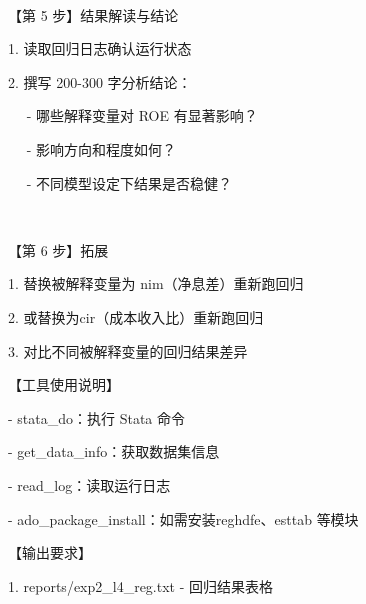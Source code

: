 \documentclass[
  american,
  chinese,
]{ctexart}
\begin{document}
\foreignlanguage{american}{}

~

{【第}\foreignlanguage{american}{ 5 }{步】结果解读与结论}\foreignlanguage{american}{}

\foreignlanguage{american}{1. }{读取回归日志确认运行状态}\foreignlanguage{american}{}

\foreignlanguage{american}{2. }{撰写}\foreignlanguage{american}{ 200-300 }{字分析结论：}\foreignlanguage{american}{}

\foreignlanguage{american}{{~~ }- }{哪些解释变量对}\foreignlanguage{american}{ ROE }{有显著影响？}\foreignlanguage{american}{}

\foreignlanguage{american}{{~~ }- }{影响方向和程度如何？}\foreignlanguage{american}{}

\foreignlanguage{american}{{~~ }- }{不同模型设定{下结果}是否稳健？}\foreignlanguage{american}{}

\foreignlanguage{american}{}

~

{【第}\foreignlanguage{american}{ 6 }{步】拓展}\foreignlanguage{american}{}

\foreignlanguage{american}{1. }{替换被解释变量为}\foreignlanguage{american}{ nim}{（净息差）重新跑回归}\foreignlanguage{american}{}

\foreignlanguage{american}{2. }{或替换为}\foreignlanguage{american}{ {cir}}{（成本收入比）重新跑回归}\foreignlanguage{american}{}

\foreignlanguage{american}{3. }{对比不同被解释变量的回归结果差异}\foreignlanguage{american}{}

{【工具使用说明】}\foreignlanguage{american}{}

\foreignlanguage{american}{- {stata\_do}}{：执行}\foreignlanguage{american}{ Stata }{命令}\foreignlanguage{american}{}

\foreignlanguage{american}{- {get\_data\_info}}{：获取数据集信息}\foreignlanguage{american}{}

\foreignlanguage{american}{- {read\_log}}{：读取运行日志}\foreignlanguage{american}{}

\foreignlanguage{american}{- {ado\_package\_install}}{：如需安装}\foreignlanguage{american}{ {reghdfe}}{、}{\foreignlanguage{american}{esttab}}\foreignlanguage{american}{ }{等模块}\foreignlanguage{american}{}

{【输出要求】}\foreignlanguage{american}{}

\foreignlanguage{american}{1. reports/exp2\_l4\_reg.txt - }{回归结果表格}\foreignlanguage{american}{}
\end{document}
